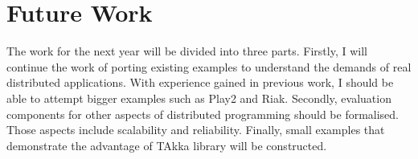\section{Future Work}
The work for the next year will be divided into three parts.  Firstly, I will continue the work of porting existing examples to understand the demands of real distributed applications.  With experience gained in previous work, I should be able to attempt bigger examples such as Play2 and Riak.  Secondly, evaluation components for other aspects of distributed programming should be formalised.  Those aspects include scalability and reliability.  Finally, small examples that demonstrate the advantage of TAkka library will be constructed.
